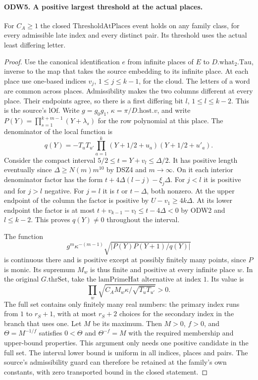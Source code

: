\paragraph{ODW5. A positive largest threshold at the actual places.}
\label{claim:ODW5}
For $C_A\ge1$ the closed $\mathrm{ThresholdAtPlaces}$ event holds on
any family class, for every admissible late index and every distinct
pair. Its threshold uses the actual least differing letter.
\begin{proof}
Use the canonical identification $e$ from infinite places of $E$ to
$D.\mathrm{what}_2.\mathrm{Tau}$, inverse to the map that takes the
source embedding to its infinite place. At each place use one-based
indices $v_j$, $1\le j\le k-1$, for the cloud. The letters of a word
are common across places. Admissibility makes the two columns different
at every place. Their endpoints agree, so there is a first differing
bit $l$, $1\le l\le k-2$. This is the source's $\mathrm{lOf}$.
Write $g=g_0g_1$, $\kappa=\pi/D.\mathrm{host}.v$, and write
$P(Y)=\prod_{s=1}^{k+m-1}(Y+\lambda_s)$ for the row polynomial at
this place. The denominator of the local function is
\[
 q(Y)=-T_uT_{u'}\prod_{a=1}^k
       (Y+1/2+u_a)(Y+1/2+u'_a).
\]
Consider the compact interval $5/2\le t=Y+v_l\le\Delta/2$.
It has positive length eventually since
$\Delta\ge N(m)m^{10}$ by DSZ4 and $m\longrightarrow\infty$.
On it each interior denominator factor has the form
$t+4\Delta(l-j)-\xi_j\Delta$. For $j<l$ it is positive and
for $j>l$ negative. For $j=l$ it is $t$ or $t-\Delta$, both
nonzero. At the upper endpoint of the column the factor is positive
by $U-v_1\ge4k\Delta$. At its lower endpoint the factor is at most
$t+v_{k-1}-v_l\le t-4\Delta<0$ by ODW2 and $l\le k-2$.
This proves $q(Y)\ne0$ throughout the interval.

The function
\[
  g^m\kappa^{-(m-1)}
     \sqrt{\left|P(Y)P(Y+1)/q(Y)\right|}
\]
is continuous there and is positive except at possibly finitely
many points, since $P$ is monic. Its supremum $M_w$ is thus
finite and positive at every infinite place $w$.
In the original $G.\mathrm{thrSet}$, take the
$\mathrm{lamPrimeHat}$ alternative at index $1$. Its value is
\[
             \prod_w\sqrt{C_A M_w\kappa/\sqrt{T_u T_{u'}}}>0 .
\]
The full set contains only finitely many real numbers: the primary
index runs from $1$ to $r_S+1$, with at most $r_S+2$ choices for
the secondary index in the branch that uses one. Let $M$ be its
maximum. Then $M>0$, $f>0$, and $\Theta=M^{-1/f}$ satisfies
$0<\Theta$ and $\Theta^{-f}=M$ with the required membership
and upper-bound properties. This argument only needs one positive
candidate in the full set. The interval lower bound is uniform
in all indices, places and pairs. The source's admissibility guard
can therefore be retained at the family's own constants, with zero
transported bound in the closed statement.
\end{proof}

